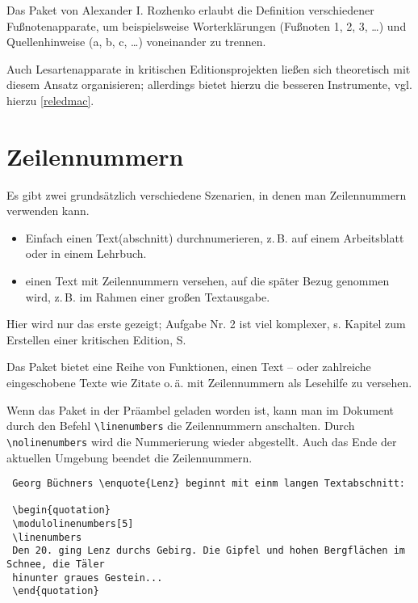 
Das Paket  von Alexander I. Rozhenko
erlaubt die Definition verschiedener Fußnotenapparate, um beispielsweise
Worterklärungen (Fußnoten 1, 2, 3, \ldots ) und Quellenhinweise (a, b, c, \ldots ) voneinander zu trennen.

Auch Lesartenapparate in kritischen Editionsprojekten ließen sich theoretisch 
mit diesem Ansatz organisieren; 
allerdings bietet  hierzu die besseren Instrumente, vgl. hierzu \ref{reledmac}.

\section{Zeilennummern} 
\label{zeilennummer}

Es gibt zwei grundsätzlich verschiedene Szenarien, in denen man Zeilennummern verwenden
kann. 

\begin{itemize}
 \item Einfach einen Text(abschnitt) durchnumerieren, z.\,B. auf einem Arbeitsblatt oder in
 einem Lehrbuch.
 \item einen Text mit Zeilennummern versehen, auf die später Bezug genommen wird, 
 z.\,B. im Rahmen einer großen Textausgabe. 
\end{itemize}

Hier wird nur das erste gezeigt;
Aufgabe Nr. 2 ist viel komplexer, s. Kapitel zum Erstellen einer kritischen Edition, 
S.~\pageref{reledmac} 

Das Paket  bietet eine Reihe von Funktionen, einen Text -- oder 
zahlreiche eingeschobene Texte wie Zitate o.\,ä. mit Zeilennummern als Lesehilfe zu 
versehen.



Wenn das Paket  in der Präambel geladen worden ist, kann man im
Dokument durch den Befehl \lstinline/\linenumbers/ die Zeilennummern anschalten.
Durch \lstinline/\nolinenumbers/ wird die Nummerierung wieder abgestellt.
Auch das Ende der aktuellen Umgebung beendet die Zeilennummern.

\begin{lstlisting}
 Georg Büchners \enquote{Lenz} beginnt mit einm langen Textabschnitt:
 
 \begin{quotation}
 \modulolinenumbers[5]
 \linenumbers
 Den 20. ging Lenz durchs Gebirg. Die Gipfel und hohen Bergflächen im Schnee, die Täler
 hinunter graues Gestein...
 \end{quotation}
\end{lstlisting}

